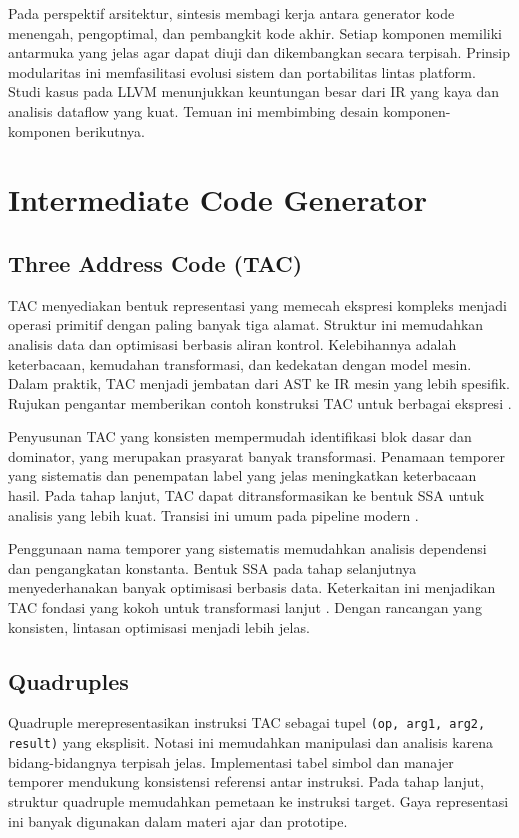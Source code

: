 \documentclass[../main.tex]{subfiles}
\begin{document}
Pada perspektif arsitektur, sintesis membagi kerja antara generator kode menengah, pengoptimal, dan pembangkit kode akhir. Setiap komponen memiliki antarmuka yang jelas agar dapat diuji dan dikembangkan secara terpisah. Prinsip modularitas ini memfasilitasi evolusi sistem dan portabilitas lintas platform. Studi kasus pada LLVM menunjukkan keuntungan besar dari IR yang kaya dan analisis dataflow yang kuat. Temuan ini membimbing desain komponen-komponen berikutnya.

\section{Intermediate Code Generator}
\subsection{Three Address Code (TAC)}
TAC menyediakan bentuk representasi yang memecah ekspresi kompleks menjadi operasi primitif dengan paling banyak tiga alamat. Struktur ini memudahkan analisis data dan optimisasi berbasis aliran kontrol. Kelebihannya adalah keterbacaan, kemudahan transformasi, dan kedekatan dengan model mesin. Dalam praktik, TAC menjadi jembatan dari AST ke IR mesin yang lebih spesifik. Rujukan pengantar memberikan contoh konstruksi TAC untuk berbagai ekspresi \citep{WikiTAC}.

Penyusunan TAC yang konsisten mempermudah identifikasi blok dasar dan dominator, yang merupakan prasyarat banyak transformasi. Penamaan temporer yang sistematis dan penempatan label yang jelas meningkatkan keterbacaan hasil. Pada tahap lanjut, TAC dapat ditransformasikan ke bentuk SSA untuk analisis yang lebih kuat. Transisi ini umum pada pipeline modern \citep{LLVMOverview}.

Penggunaan nama temporer yang sistematis memudahkan analisis dependensi dan pengangkatan konstanta. Bentuk SSA pada tahap selanjutnya menyederhanakan banyak optimisasi berbasis data. Keterkaitan ini menjadikan TAC fondasi yang kokoh untuk transformasi lanjut \citep{WikiTAC}. Dengan rancangan yang konsisten, lintasan optimisasi menjadi lebih jelas.

\subsection{Quadruples}
Quadruple merepresentasikan instruksi TAC sebagai tupel \texttt{(op, arg1, arg2, result)} yang eksplisit. Notasi ini memudahkan manipulasi dan analisis karena bidang-bidangnya terpisah jelas. Implementasi tabel simbol dan manajer temporer mendukung konsistensi referensi antar instruksi. Pada tahap lanjut, struktur quadruple memudahkan pemetaan ke instruksi target. Gaya representasi ini banyak digunakan dalam materi ajar dan prototipe.
\end{document}
